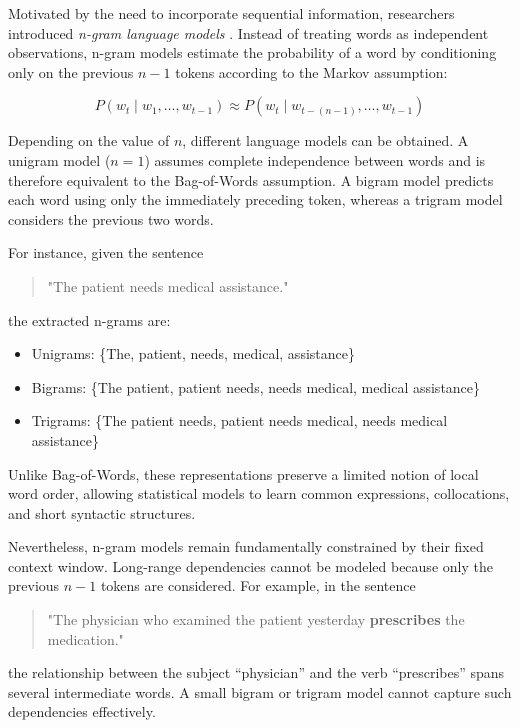 Motivated by the need to incorporate sequential information, researchers introduced \textit{n-gram language models} \cite{fink2014n}. Instead of treating words as independent observations, n-gram models estimate the probability of a word by conditioning only on the previous $n-1$ tokens according to the Markov assumption:

\begin{equation*}
P(w_t \mid w_1,\ldots,w_{t-1})
\approx
P(w_t \mid w_{t-(n-1)},\ldots,w_{t-1})
\end{equation*}

Depending on the value of $n$, different language models can be obtained. A unigram model ($n=1$) assumes complete independence between words and is therefore equivalent to the Bag-of-Words assumption. A bigram model predicts each word using only the immediately preceding token, whereas a trigram model considers the previous two words.

For instance, given the sentence

\begin{quote}
"The patient needs medical assistance."
\end{quote}

the extracted n-grams are:

\begin{itemize}
\item Unigrams: \{The, patient, needs, medical, assistance\}
\item Bigrams: \{The patient, patient needs, needs medical, medical assistance\}
\item Trigrams: \{The patient needs, patient needs medical, needs medical assistance\}
\end{itemize}

Unlike Bag-of-Words, these representations preserve a limited notion of local word order, allowing statistical models to learn common expressions, collocations, and short syntactic structures.

Nevertheless, n-gram models remain fundamentally constrained by their fixed context window. Long-range dependencies cannot be modeled because only the previous $n-1$ tokens are considered. For example, in the sentence

\begin{quote}
"The physician who examined the patient yesterday \textbf{prescribes} the medication."
\end{quote}

the relationship between the subject ``physician'' and the verb ``prescribes'' spans several intermediate words. A small bigram or trigram model cannot capture such dependencies effectively.

